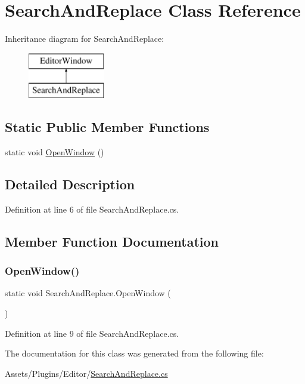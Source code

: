 \hypertarget{class_search_and_replace}{}\section{Search\+And\+Replace Class Reference}
\label{class_search_and_replace}
Inheritance diagram for Search\+And\+Replace\+:\begin{figure}[H]
\begin{center}
\leavevmode
\includegraphics[height=2.000000cm]{class_search_and_replace}
\end{center}
\end{figure}
\subsection*{Static Public Member Functions}
\begin{DoxyCompactItemize}
\item 
static void \mbox{\hyperlink{class_search_and_replace_acd3b15bb1628356229b6ecc9b10cbece}{Open\+Window}} ()
\end{DoxyCompactItemize}


\subsection{Detailed Description}


Definition at line 6 of file Search\+And\+Replace.\+cs.



\subsection{Member Function Documentation}
\mbox{\label{class_search_and_replace_acd3b15bb1628356229b6ecc9b10cbece}} 
\subsubsection{\texorpdfstring{Open\+Window()}{OpenWindow()}}
{\footnotesize\ttfamily static void Search\+And\+Replace.\+Open\+Window (\begin{DoxyParamCaption}{ }\end{DoxyParamCaption})\hspace{0.3cm}{\ttfamily [static]}}



Definition at line 9 of file Search\+And\+Replace.\+cs.



The documentation for this class was generated from the following file\+:\begin{DoxyCompactItemize}
\item 
Assets/\+Plugins/\+Editor/\mbox{\hyperlink{_search_and_replace_8cs}{Search\+And\+Replace.\+cs}}\end{DoxyCompactItemize}
